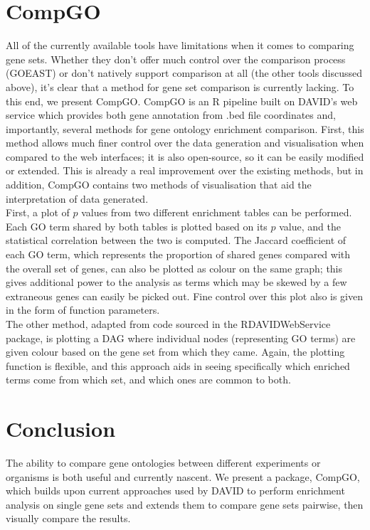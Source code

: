 \documentclass[11pt, oneside]{article}
\begin{document}
\section*{CompGO}
All of the currently available tools have limitations when it comes to comparing gene sets. Whether they don't offer much control over the comparison process (GOEAST) or don't natively support comparison at all (the other tools discussed above), it's clear that a method for gene set comparison is currently lacking. To this end, we present CompGO. CompGO is an R pipeline built on DAVID's web service which provides both gene annotation from .bed file coordinates and, importantly, several methods for gene ontology enrichment comparison. First, this method allows much finer control over the data generation and visualisation when compared to the web interfaces; it is also open-source, so it can be easily modified or extended. This is already a real improvement over the existing methods, but in addition, CompGO contains two methods of visualisation that aid the interpretation of data generated.\\
First, a plot of $p$ values from two different enrichment tables can be performed. Each GO term shared by both tables is plotted based on its $p$ value, and the statistical correlation between the two is computed. The Jaccard coefficient of each GO term, which represents the proportion of shared genes compared with the overall set of genes, can also be plotted as colour on the same graph; this gives additional power to the analysis as terms which may be skewed by a few extraneous genes can easily be picked out. Fine control over this plot also is given in the form of function parameters.\\
The other method, adapted from code sourced in the RDAVIDWebService package, is plotting a DAG where individual nodes (representing GO terms) are given colour based on the gene set from which they came. Again, the plotting function is flexible, and this approach aids in seeing specifically which enriched terms come from which set, and which ones are common to both.

\section*{Conclusion}
The ability to compare gene ontologies between different experiments or organisms is both useful and currently nascent. We present a package, CompGO, which builds upon current approaches used by DAVID to perform enrichment analysis on single gene sets and extends them to compare gene sets pairwise, then visually compare the results. 
\end{document}
